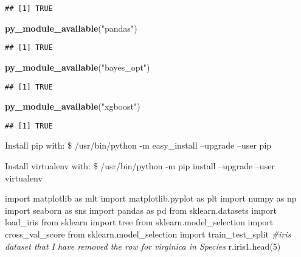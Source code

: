 \documentclass[]{article}
\newenvironment{Shaded}{\begin{snugshade}}{\end{snugshade}}
\newcommand{\CommentTok}[1]{\textcolor[rgb]{0.56,0.35,0.01}{\textit{#1}}}
\newcommand{\DecValTok}[1]{\textcolor[rgb]{0.00,0.00,0.81}{#1}}
\newcommand{\ImportTok}[1]{#1}
\newcommand{\KeywordTok}[1]{\textcolor[rgb]{0.13,0.29,0.53}{\textbf{#1}}}
\newcommand{\NormalTok}[1]{#1}
\newcommand{\StringTok}[1]{\textcolor[rgb]{0.31,0.60,0.02}{#1}}
\begin{document}
\begin{verbatim}
## [1] TRUE
\end{verbatim}

\begin{Shaded}
\begin{Highlighting}[]
\KeywordTok{py_module_available}\NormalTok{(}\StringTok{"pandas"}\NormalTok{)}
\end{Highlighting}
\end{Shaded}

\begin{verbatim}
## [1] TRUE
\end{verbatim}

\begin{Shaded}
\begin{Highlighting}[]
\KeywordTok{py_module_available}\NormalTok{(}\StringTok{"bayes_opt"}\NormalTok{)}
\end{Highlighting}
\end{Shaded}

\begin{verbatim}
## [1] TRUE
\end{verbatim}

\begin{Shaded}
\begin{Highlighting}[]
\KeywordTok{py_module_available}\NormalTok{(}\StringTok{"xgboost"}\NormalTok{)}
\end{Highlighting}
\end{Shaded}

\begin{verbatim}
## [1] TRUE
\end{verbatim}

Install pip with: \$ /usr/bin/python -m easy\_install --upgrade --user
pip

Install virtualenv with: \$ /usr/bin/python -m pip install --upgrade
--user virtualenv

\begin{Shaded}
\begin{Highlighting}[]

\ImportTok{import}\NormalTok{ matplotlib }\ImportTok{as}\NormalTok{ mlt}
\ImportTok{import}\NormalTok{ matplotlib.pyplot }\ImportTok{as}\NormalTok{ plt}
\ImportTok{import}\NormalTok{ numpy }\ImportTok{as}\NormalTok{ np}
\ImportTok{import}\NormalTok{ seaborn }\ImportTok{as}\NormalTok{ sns}
\ImportTok{import}\NormalTok{ pandas }\ImportTok{as}\NormalTok{ pd}
\ImportTok{from}\NormalTok{ sklearn.datasets }\ImportTok{import}\NormalTok{ load_iris}
\ImportTok{from}\NormalTok{ sklearn }\ImportTok{import}\NormalTok{ tree}
\ImportTok{from}\NormalTok{ sklearn.model_selection }\ImportTok{import}\NormalTok{ cross_val_score}
\ImportTok{from}\NormalTok{ sklearn.model_selection }\ImportTok{import}\NormalTok{ train_test_split}
\CommentTok{#iris dataset that I have removed the row for virginica in Species}
\NormalTok{r.iris1.head(}\DecValTok{5}\NormalTok{)}
\end{Highlighting}
\end{Shaded}
\end{document}

